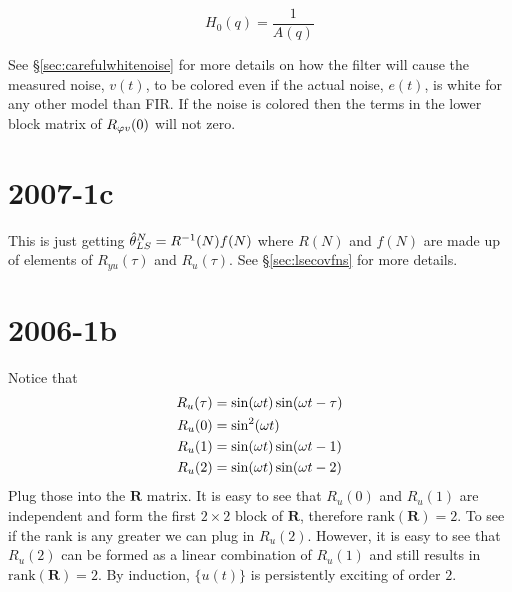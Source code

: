 \begin{equation*}
H_0(q)=\frac{1}{A(q)}
\end{equation*}

See \S\ref{sec:carefulwhitenoise} for more details on how the filter will cause the measured noise, $v(t)$, to be colored even if the actual noise, $e(t)$, is white for any other model than FIR\@.
If the noise is colored then the terms in the lower block matrix of $R_{\varphi v}(0)$ will not zero.

\section{2007-1c}%
This is just getting $\hat{\theta}_{LS}^N=R^{-1}(N)f(N)$ where $R(N)$ and $f(N)$ are made up of elements of $R_{yu}(\tau)$ and $R_u(\tau)$.
See \S\ref{sec:lsecovfns} for more details.

\section{2006-1b}%
Notice that
\begin{align*}
R_u(\tau) &= \sin(\omega t)\sin(\omega t-\tau) \\
R_u(0) &= \sin^2(\omega t) \\
R_u(1) &= \sin(\omega t)\sin(\omega t-1) \\
R_u(2) &= \sin(\omega t)\sin(\omega t-2)
\end{align*}
Plug those into the $\mathbf{R}$ matrix.
It is easy to see that $R_u(0)$ and $R_u(1)$ are independent and form the first $2\times 2$ block of $\mathbf{R}$, therefore $\text{rank}(\mathbf{R})=2$.
To see if the rank is any greater we can plug in $R_u(2)$.
However, it is easy to see that $R_u(2)$ can be formed as a linear combination of $R_u(1)$ and still results in $\text{rank}(\mathbf{R})=2$.
By induction, $\{u(t)\}$ is persistently exciting of order $2$.

